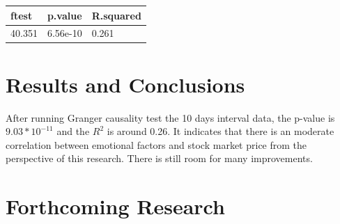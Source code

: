 \documentclass[a0,landscape]{a0poster}\usepackage[]{graphicx}\usepackage[]{color}
\newenvironment{knitrout}{}{} %
\begin{document}
\begin{multicols}{4}
\begin{itemize}
\begin{center}

\begin{knitrout}
\color{fgcolor}
\begin{tabular}{l|l|l}
\hline
ftest & p.value & R.squared\\
\hline
40.351 & 6.56e-10 & 0.261\\
\hline
\end{tabular}


\end{knitrout}

\end{center}

\end{itemize}







\color{SaddleBrown} %

\section*{Results and Conclusions}

\item After running Granger causality test the 10 days interval data, the p-value is $9.03*10^{-11}$ and the $R^2$ is around 0.26. It indicates that there is an moderate correlation between emotional factors and stock market price from the perspective of this research. There is still room for many improvements. 

\color{DarkSlateGray} %


\section*{Forthcoming Research}


\end{multicols}
\end{document}
